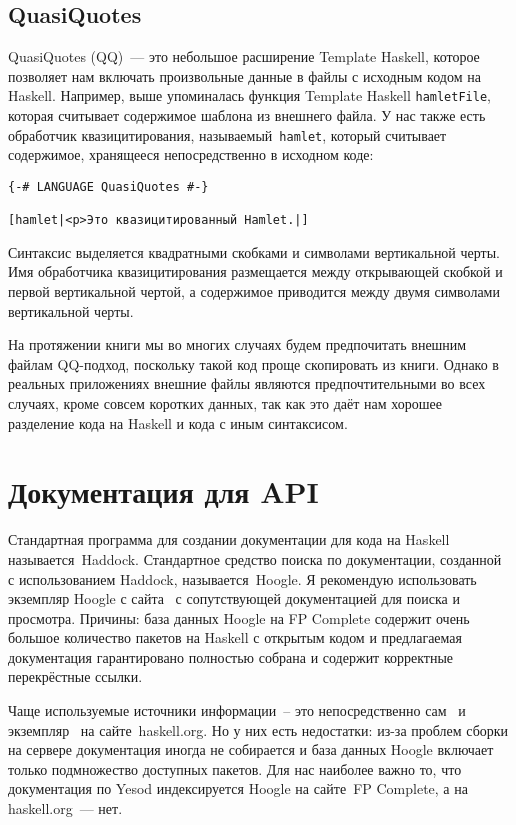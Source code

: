 \subsection{QuasiQuotes}

QuasiQuotes (QQ)~--- это небольшое расширение Template Haskell, которое
позволяет нам включать произвольные данные в файлы с исходным кодом на Haskell.
Например, выше упоминалась функция Template Haskell \lstinline'hamletFile',
которая считывает содержимое шаблона из внешнего файла. У нас также есть
обработчик квазицитирования, называемый~\lstinline'hamlet', который считывает
содержимое, хранящееся непосредственно в исходном коде:

\begin{lstlisting}
{-# LANGUAGE QuasiQuotes #-}

[hamlet|<p>Это квазицитированный Hamlet.|]
\end{lstlisting}

Синтаксис выделяется квадратными скобками и символами вертикальной черты. Имя
обработчика квазицитирования размещается между открывающей скобкой и первой
вертикальной чертой, а содержимое приводится между двумя символами вертикальной
черты.

На протяжении книги мы во многих случаях будем предпочитать внешним файлам
QQ-подход, поскольку такой код проще скопировать из книги. Однако в реальных
приложениях внешние файлы являются предпочтительными во всех случаях, кроме
совсем коротких данных, так как это даёт нам хорошее разделение кода на Haskell
и кода с иным синтаксисом.

\section{Документация для API}
Стандартная программа для создании документации для кода на Haskell
называется~Haddock. Стандартное средство поиска по документации, созданной с
использованием Haddock, называется~Hoogle. Я рекомендую использовать экземпляр
Hoogle с сайта~
с сопутствующей документацией для поиска и просмотра. Причины: база данных
Hoogle на FP Complete содержит очень большое количество пакетов на Haskell с
открытым кодом и предлагаемая документация гарантировано полностью собрана и
содержит корректные перекрёстные ссылки.

Чаще используемые источники информации~-- это непосредственно сам~%
 и экземпляр~%
 на сайте~haskell.org. Но у
них есть недостатки: из-за проблем сборки на сервере документация иногда не
собирается и база данных Hoogle включает только подмножество доступных пакетов.
Для нас наиболее важно то, что документация по Yesod индексируется Hoogle на
сайте~FP Complete, а на haskell.org~--- нет.

